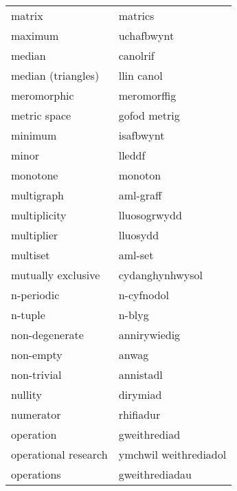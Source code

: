 \begin{supertabular}{p{0.22\textwidth}p{0.22\textwidth}}
                           matrix &                          matrics \\
                          maximum &                       uchafbwynt \\
                           median &                         canolrif \\
               median (triangles) &                       llin canol \\
                      meromorphic &                      meromorffig \\
                     metric space &                     gofod metrig \\
                          minimum &                        isafbwynt \\
                            minor &                           lleddf \\
                         monotone &                          monoton \\
                       multigraph &                        aml-graff \\
                     multiplicity &                     lluosogrwydd \\
                       multiplier &                         lluosydd \\
                         multiset &                          aml-set \\
               mutually exclusive &                  cydanghynhwysol \\
                       n-periodic &                       n-cyfnodol \\
                          n-tuple &                           n-blyg \\
                   non-degenerate &                     annirywiedig \\
                        non-empty &                            anwag \\
                      non-trivial &                        annistadl \\
                          nullity &                         dirymiad \\
                        numerator &                        rhifiadur \\
                        operation &                     gweithrediad \\
             operational research &            ymchwil weithrediadol \\
                       operations &                   gweithrediadau \\

\end{supertabular}

